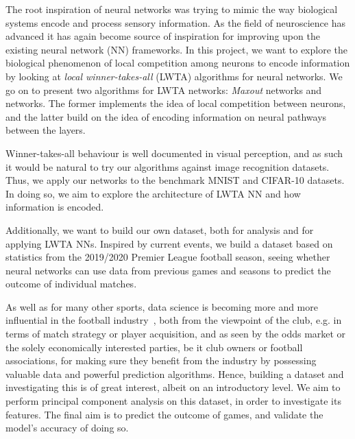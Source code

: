 The root inspiration of neural networks was trying to mimic the way biological systems encode and process sensory information. As the field of neuroscience has advanced it has again become source of inspiration for improving upon the existing neural network (NN) frameworks. In this project, we want to explore the biological phenomenon of local competition among neurons to encode information by looking at \textit{local winner-takes-all} (LWTA) algorithms for neural networks. We go on to present two algorithms for LWTA networks: \textit{Maxout} networks and  networks. The former implements the idea of local competition between neurons, and the latter build on the idea of encoding information on neural pathways between the layers.

Winner-takes-all behaviour is well documented in visual perception, and as such it would be natural to try our algorithms against image recognition datasets. Thus, we apply our networks to the benchmark MNIST and CIFAR-10 datasets. In doing so, we aim to explore the architecture of LWTA NN and how information is encoded.

Additionally, we want to build our own dataset, both for analysis and for applying LWTA NNs. Inspired by current events, we build a dataset based on statistics from the 2019/2020 Premier League football season, seeing whether neural networks can use data from previous games and seasons to predict the outcome of individual matches.

As well as for many other sports, data science is becoming more and more influential in the football industry~\citep{Herbinet2018}, both from the viewpoint of the club, e.g. in terms of match strategy or player acquisition, and as seen by the odds market or the solely economically interested parties, be it club owners or football associations, for making sure they benefit from the industry by possessing valuable data and powerful prediction algorithms. Hence, building a dataset and investigating this is of great interest, albeit on an introductory level. We aim to perform principal component analysis on this dataset, in order to investigate its features. The final aim is to predict the outcome of games, and validate the model's accuracy of doing so. 

